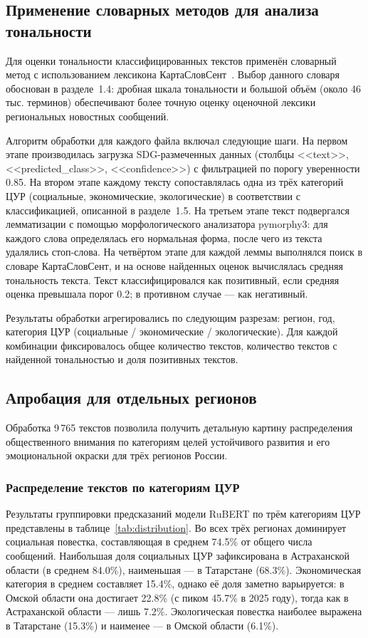 \documentclass[master, och, coursework]{SCWorks1}
\begin{document}
	\subsection{Применение словарных методов для анализа тональности}

Для оценки тональности классифицированных текстов применён словарный метод с использованием лексикона КартаСловСент~\cite{Kartaslovsent}. Выбор данного словаря обоснован в разделе~1.4: дробная шкала тональности и большой объём (около 46 тыс. терминов) обеспечивают более точную оценку оценочной лексики региональных новостных сообщений.

Алгоритм обработки для каждого файла включал следующие шаги. На первом этапе производилась загрузка SDG-размеченных данных (столбцы <<text>>, <<predicted\_class>>, <<confidence>>) с фильтрацией по порогу уверенности 0.85. На втором этапе каждому тексту сопоставлялась одна из трёх категорий ЦУР (социальные, экономические, экологические) в соответствии с классификацией, описанной в разделе~1.5. На третьем этапе текст подвергался лемматизации с помощью морфологического анализатора pymorphy3: для каждого слова определялась его нормальная форма, после чего из текста удалялись стоп-слова. На четвёртом этапе для каждой леммы выполнялся поиск в словаре КартаСловСент, и на основе найденных оценок вычислялась средняя тональность текста. Текст классифицировался как позитивный, если средняя оценка превышала порог 0.2; в противном случае --- как негативный.

Результаты обработки агрегировались по следующим разрезам: регион, год, категория ЦУР (социальные / экономические / экологические). Для каждой комбинации фиксировалось общее количество текстов, количество текстов с найденной тональностью и доля позитивных текстов.

	\subsection{Апробация для отдельных регионов}

Обработка 9\,765 текстов позволила получить детальную картину распределения общественного внимания по категориям целей устойчивого развития и его эмоциональной окраски для трёх регионов России.

\subsubsection{Распределение текстов по категориям ЦУР}

Результаты группировки предсказаний модели RuBERT по трём категориям ЦУР представлены в таблице~\ref{tab:distribution}. Во всех трёх регионах доминирует социальная повестка, составляющая в среднем 74.5\% от общего числа сообщений. Наибольшая доля социальных ЦУР зафиксирована в Астраханской области (в среднем 84.0\%), наименьшая --- в Татарстане (68.3\%). Экономическая категория в среднем составляет 15.4\%, однако её доля заметно варьируется: в Омской области она достигает 22.8\% (с пиком 45.7\% в 2025 году), тогда как в Астраханской области --- лишь 7.2\%. Экологическая повестка наиболее выражена в Татарстане (15.3\%) и наименее --- в Омской области (6.1\%).
\end{document}
